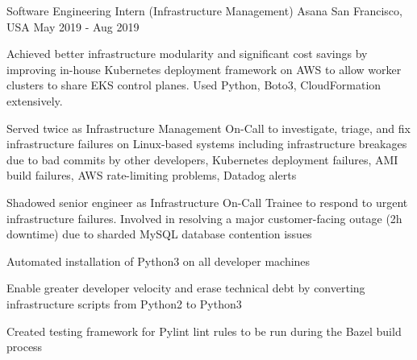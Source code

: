 

\begin{cventries}


  \cventry
  {Software Engineering Intern (Infrastructure Management)} %
    {Asana} %
    {San Francisco, USA} %
    {May 2019 - Aug 2019} %
    {
      \begin{cvitems} %
      \item {Achieved better infrastructure modularity and significant cost savings by improving in-house Kubernetes deployment framework on AWS to allow worker clusters to share EKS control planes. Used Python, Boto3, CloudFormation extensively.}
      \item {Served twice as Infrastructure Management On-Call to investigate, triage, and fix infrastructure failures on Linux-based systems including infrastructure breakages due to bad commits by other developers, Kubernetes deployment failures, AMI build failures, AWS rate-limiting problems, Datadog alerts}
      \item {Shadowed senior engineer as Infrastructure On-Call Trainee to respond to urgent infrastructure failures. Involved in resolving a major customer-facing outage (2h downtime) due to sharded MySQL database contention issues}
      \item {Automated installation of Python3 on all developer machines}
      \item {Enable greater developer velocity and erase technical debt by converting infrastructure scripts from Python2 to Python3}
      \item {Created testing framework for Pylint lint rules to be run during the Bazel build process}
      \end{cvitems}
    }


\end{cventries}
